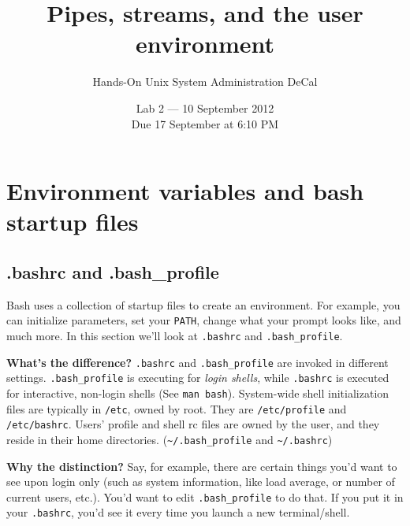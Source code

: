 \documentclass{article}
\begin{document}
\title{Pipes, streams, and the user environment}
\author{Hands-On {\sc Unix} System Administration DeCal}
\date{Lab 2 --- 10 September 2012 \\ {\small Due 17 September at 6:10 PM}} 
\maketitle

\section{Environment variables and bash startup files}
\subsection{.bashrc and .bash\_profile} 

Bash uses a collection of startup files to create an environment. For example, you can initialize parameters, set your \texttt{PATH}, change what your prompt looks like, and much more. In this section we'll look at \texttt{.bashrc} and \texttt{.bash\_profile}. 

{\bf What's the difference?} 
\texttt{.bashrc} and \texttt{.bash\_profile} are invoked in different settings. \texttt{.bash\_profile} is executing for {\it login shells}, while \texttt{.bashrc} is executed for interactive, non-login shells (See \texttt{man bash}).
System-wide shell initialization files are typically in \texttt{/etc}, owned by root. They are \texttt{/etc/profile} and \texttt{/etc/bashrc}. Users' profile and shell rc files are owned by the user, and they reside in their home directories. 
(\texttt{\textasciitilde/.bash\_profile} and 
\texttt{\textasciitilde/.bashrc})

{\bf Why the distinction?} 
Say, for example, there are certain things you'd want to see upon login only (such as system information, like load average, or number of current users, etc.). 
You'd want to edit \texttt{.bash\_profile} to do that. If you put it in your \texttt{.bashrc}, you'd see it every time you launch a new terminal/shell. 
\end{document}
